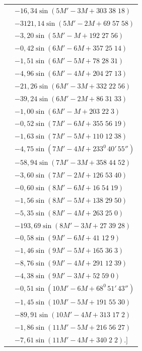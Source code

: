 \begin{landscape}
\begin{longtable}{@{}r@{}l@{}}
&\(-16{,}34\sin(5M'-3M+303\;38\;18)\)\\
&\(-3121{,}14\sin(5M'-2M+69\;57\;58)\)\\
&\(-3{,}20\sin(5M'-M+192\;27\;56)\)\\[3pt]
&\(-0{,}42\sin(6M'-6M+357\;25\;14)\)\\
&\(-1{,}51\sin(6M'-5M+78\;28\;31)\)\\
&\(-4{,}96\sin(6M'-4M+204\;27\;13)\)\\
&\(-21{,}26\sin(6M'-3M+332\;22\;56)\)\\
&\(-39{,}24\sin(6M'-2M+86\;31\;33)\)\\
&\(-1{,}00\sin(6M'-M+203\;22\;3)\)\\[3pt]
&\(-0{,}52\sin(7M'-6M+355\;56\;19)\)\\
&\(-1{,}63\sin(7M'-5M+110\;12\;38)\)\\
&\(-4{,}75\sin(7M'-4M+233^0\,40'\,55'')\)\\
&\(-58{,}94\sin(7M'-3M+358\;44\;52)\)\\
&\(-3{,}60\sin(7M'-2M+126\;53\;40)\)\\[3pt]
&\(-0{,}60\sin(8M'-6M+16\;54\;19)\)\\
&\(-1{,}56\sin(8M'-5M+138\;29\;50)\)\\
&\(-5{,}35\sin(8M'-4M+263\;25\;0)\)\\
&\(-193{,}69\sin(8M'-3M+27\;39\;28)\)\\[3pt]
&\(-0{,}58\sin(9M'-6M+41\;12\;9)\)\\
&\(-1{,}46\sin(9M'-5M+165\;36\;3)\)\\
&\(-8{,}76\sin(9M'-4M+291\;12\;39)\)\\
&\(-4{,}38\sin(9M'-3M+52\;59\;0)\)\\[3pt]
&\(-0{,}51\sin(10M'-6M+68^0\,51'\,43'')\)\\
&\(-1{,}45\sin(10M'-5M+191\;55\;30)\)\\
&\(-89{,}91\sin(10M'-4M+313\;17\;2)\)\\[3pt]
&\(-1{,}86\sin(11M'-5M+216\;56\;27)\)\\
&\(-7{,}61\sin(11M'-4M+340\;2\;2).]\)
\end{longtable}
\endgroup
\clearpage
\endgroup
\end{landscape}
